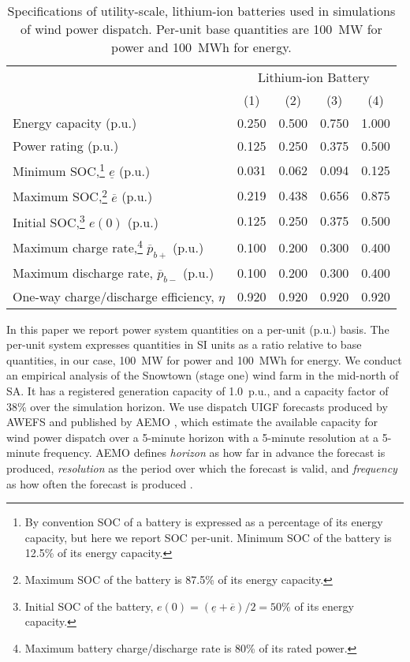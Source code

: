 \documentclass[3p,times,procedia]{elsarticle}
\def\eff{\eta}
\begin{document}
\begin{table}[!t]
\begin{minipage}{\textwidth}		%
	\centering
	\caption{Specifications of utility-scale, lithium-ion batteries used in simulations of wind power dispatch.  Per-unit base quantities are 100~MW for power and 100~MWh for energy.\vspace*{1.0em}}
	\label{tbl:bess_specs}
	\begin{tabular}{l r r r r}
		\toprule
		& \multicolumn{4}{c}{Lithium-ion Battery} \\
		& \multicolumn{1}{c}{(1)}	& \multicolumn{1}{c}{(2)}	& \multicolumn{1}{c}{(3)}	& \multicolumn{1}{c}{(4)}	\\
		\midrule
		Energy capacity (p.u.)				& 0.250	& 0.500	& 0.750	& 1.000	\\
		Power rating (p.u.)					& 0.125	& 0.250	& 0.375	& 0.500	\\
		Minimum SOC,\footnote{By convention SOC of a battery is expressed as a percentage of its energy capacity, but here we report SOC per-unit.  Minimum SOC of the battery is 12.5\% of its energy capacity.} $\underline{e}$ (p.u.)	& 0.031	& 0.062	& 0.094	& 0.125	\\
		Maximum SOC,\footnote{Maximum SOC of the battery is 87.5\% of its energy capacity.} $\overline{e}$ (p.u.)	& 0.219	& 0.438	& 0.656	& 0.875	\\
		Initial SOC,\footnote{Initial SOC of the battery, $e(0) = (\underline{e}+\overline{e})/2 = 50\%$ of its energy capacity.}	$e(0)$ (p.u.)	& 0.125	& 0.250	& 0.375	& 0.500	\\
		Maximum charge rate,\footnote{Maximum battery charge/discharge rate is 80\% of its rated power.\label{fn:max_chrg_rt}} $\overline{p}_{b+}$ (p.u.)	& 0.100	& 0.200	& 0.300	& 0.400	\\
		Maximum discharge rate,\footref{fn:max_chrg_rt} $\overline{p}_{b-}$ (p.u.)	& 0.100	& 0.200	& 0.300	& 0.400	\\
		One-way charge/discharge efficiency, $\eff$		& 0.920	& 0.920	& 0.920	& 0.920	\\
		\bottomrule
		\end{tabular}
\end{minipage}
\end{table}

In this paper we report power system quantities on a per-unit (p.u.) basis.  The per-unit system expresses quantities in SI units as a ratio relative to base quantities, in our case, 100~MW for power and 100~MWh for energy.  We conduct an empirical analysis of the Snowtown (stage one) wind farm in the mid-north of SA.  It has a registered generation capacity of 1.0~p.u., and a capacity factor of 38\% over the simulation horizon.  We use dispatch UIGF forecasts produced by AWEFS and published by AEMO \cite{AEMO16a}, which estimate the available capacity for wind power dispatch over a 5-minute horizon with a 5-minute resolution at a 5-minute frequency.  AEMO defines \textit{horizon} as how far in advance the forecast is produced, \textit{resolution} as the period over which the forecast is valid, and \textit{frequency} as how often the forecast is produced \cite{AEMO16b}.
\end{document}
